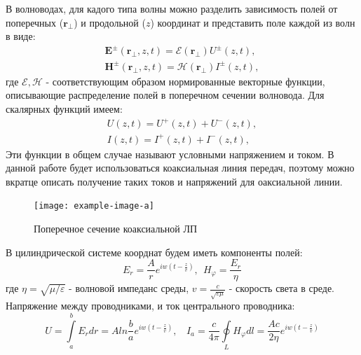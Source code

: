 В волноводах, для кадого типа волны можно разделить зависимость полей от поперечных ($\textbf{r}_{\bot}$) и продольной
($z$) координат и представить поле каждой из волн в виде:
\begin{equation}
    \begin{split}
        \textbf{E}^{\pm}(\textbf{r}_{\bot},z,t) = \mathcal{E} (\textbf{r}_{\bot}) U^{\pm}(z,t),\\
        \textbf{H}^{\pm}(\textbf{r}_{\bot},z,t) = \mathcal{H} (\textbf{r}_{\bot}) I^{\pm}(z,t),  
    \end{split}
    \label{eq:3}
\end{equation}
где $ \mathcal{E}, \mathcal{H}$ - соответствующим образом нормированные векторные функции, описывающие распределение
полей в поперечном сечении волновода. Для скалярных функций имеем:
\begin{equation}
    \begin{split}
        U(z,t) = U^+(z,t)+U^-(z,t),\\
        I(z,t) = I^+(z,t)+I^-(z,t),  
    \end{split}
    \label{eq:4}
\end{equation}
Эти функции в общем случае называют условными напряжением и током. В данной работе будет использоваться коаксиальная
линия передач, поэтому можно вкратце описать получение таких токов и напряжений для оаксиальной линии.
\begin{center}
    \begin{figure}[h!]
        \centering
        \texttt{[image: example-image-a]}
        \label{fig:1}
        \caption{Поперечное сечение коаксиальной ЛП}
    \end{figure}
\end{center}
В цилиндрической системе коорднат будем иметь компоненты полей: 
\begin{equation}
    E_r = \frac{A}{r} e^{iw(t-\frac{z}{v})},~~ H_{\varphi} = \frac{E_r}{\eta}
    \label{eq:5}
\end{equation}
где $\eta = \sqrt{\mu / \varepsilon}$ - волновой импеданс среды, $v = \frac{c}{\sqrt{\varepsilon \mu}}$ - скорость света в
среде. Напряжение между проводниками, и ток центрального проводника:
\begin{equation}
    U = \int \limits_a^b E_r dr = A ln \frac{b}{a} e^{iw(t-\frac{z}{v})},~~~~
    I_a = \frac{c}{4 \pi } \oint \limits_L H_{\varphi} dl = \frac{A c}{2 \eta} e^{iw(t-\frac{z}{v})}
    \label{eq:6}
\end{equation}

